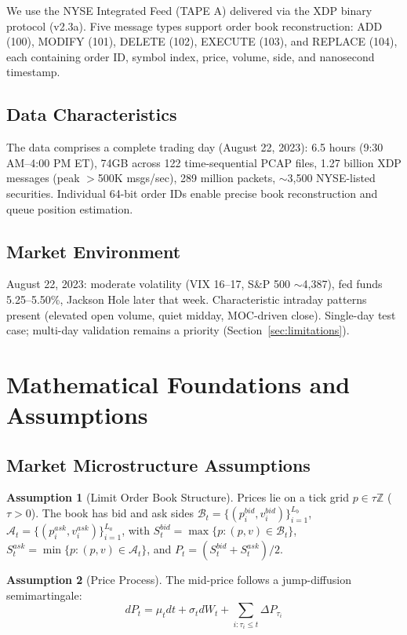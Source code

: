 \documentclass[11pt]{article}
\theoremstyle{definition}
\newtheorem{assumption}{Assumption}[section]
\begin{document}
We use the NYSE Integrated Feed (TAPE A) delivered via the XDP binary protocol (v2.3a). Five message types support order book reconstruction: ADD (100), MODIFY (101), DELETE (102), EXECUTE (103), and REPLACE (104), each containing order ID, symbol index, price, volume, side, and nanosecond timestamp.

\subsection{Data Characteristics}

The data comprises a complete trading day (August 22, 2023): 6.5 hours (9:30 AM--4:00 PM ET), 74GB across 122 time-sequential PCAP files, 1.27 billion XDP messages (peak $>$500K msgs/sec), 289 million packets, $\sim$3,500 NYSE-listed securities. Individual 64-bit order IDs enable precise book reconstruction and queue position estimation.

\subsection{Market Environment}

August 22, 2023: moderate volatility (VIX 16--17, S\&P 500 $\sim$4,387), fed funds 5.25--5.50\%, Jackson Hole later that week. Characteristic intraday patterns present (elevated open volume, quiet midday, MOC-driven close). Single-day test case; multi-day validation remains a priority (Section~\ref{sec:limitations}).

\section{Mathematical Foundations and Assumptions}

\subsection{Market Microstructure Assumptions}

\begin{assumption}[Limit Order Book Structure]
Prices lie on a tick grid $p \in \tau \mathbb{Z}$ ($\tau > 0$). The book has bid and ask sides $\mathcal{B}_t = \{(p_i^{bid}, v_i^{bid})\}_{i=1}^{L_b}$, $\mathcal{A}_t = \{(p_i^{ask}, v_i^{ask})\}_{i=1}^{L_a}$, with $S_t^{bid} = \max\{p : (p,v) \in \mathcal{B}_t\}$, $S_t^{ask} = \min\{p : (p,v) \in \mathcal{A}_t\}$, and $P_t = (S_t^{bid} + S_t^{ask})/2$.
\end{assumption}

\begin{assumption}[Price Process]
The mid-price follows a jump-diffusion semimartingale:
\begin{equation}
dP_t = \mu_t dt + \sigma_t dW_t + \sum_{i: \tau_i \leq t} \Delta P_{\tau_i}
\end{equation}
\end{assumption}
\end{document}
